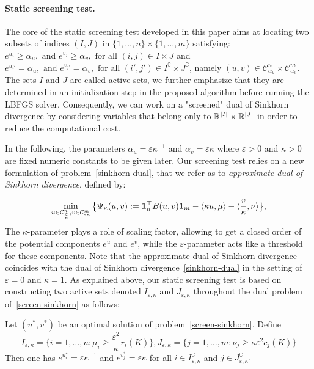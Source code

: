 \paragraph{Static screening test.} The core of the static screening test developed in this paper aims at locating two subsets of indices $(I, J)$ in $\{1, \ldots, n\}\times\{1, \ldots, m\}$ satisfying: $e^{u_i}\geq \alpha_u, \text{ and } e^{v_j}\geq \alpha_v, \text{ for all } (i,j) \in I \times J$ and 
$e^{u_{i'}} = \alpha_u, \text{ and } e^{v_{j'}} = \alpha_v, \text{ for all } (i',j') \in I^\complement \times J^\complement$, namely $(u,v) \in \mathcal{C}^n_{\alpha_u}\times \mathcal{C}^m_{\alpha_v}$.
The sets $I$ and $J$ are called active sets, we further emphasize that they are determined in an initialization step in the proposed algorithm before running the LBFGS solver.
Consequently, we can work on a "screened" dual of Sinkhorn divergence by considering variables that belong only to ${\mathbb{R}}^{|I|} \times {\mathbb{R}}^{|J|}$ in order to reduce the computational cost.

In the following, the parameters $\alpha_u = \varepsilon \kappa^{-1}$ and $\alpha_v = \varepsilon \kappa$ where $\varepsilon > 0$ and $\kappa > 0$ are fixed numeric constants to be given later. 
Our screening test relies on a new formulation of problem~\eqref{sinkhorn-dual}, that we refer as to \emph{approximate dual of Sinkhorn divergence}, defined by:

\begin{equation} 
\label{screen-sinkhorn}
\min_{u \in \mathcal{C}^n_{\frac \varepsilon \kappa}, v\in \mathcal{C}^m_{\varepsilon\kappa}} \big\{\Psi_{\kappa}(u,v):= \mathbf{1}_n^\top B(u,v)\mathbf{1}_m - \langle \kappa u, \mu \rangle - \langle \frac v\kappa, \nu \rangle \big\},
\end{equation}
The $\kappa$-parameter plays a role of scaling factor, allowing to get a closed order of the potential components $e^u$ and $e^v$, while the $\varepsilon$-parameter acts like a threshold for these components.
Note that the approximate dual of Sinkhorn divergence coincides with the dual of Sinkhorn divergence~\eqref{sinkhorn-dual} in the setting of $\varepsilon=0$ and $\kappa=1$.
As explained above, our static screening test is based on constructing two {active sets} denoted $I_{\varepsilon, \kappa}$ and $J_{\varepsilon, \kappa}$ throughout the dual problem of~\eqref{screen-sinkhorn} as follows: 

\begin{lemma}
\label{lemma_actives_sets}
Let $(u^{*}, v^{*})$ be an optimal solution of problem~\eqref{screen-sinkhorn}. 
Define
\begin{equation}
\label{I_epsilon_kappa_J_epsilon_kappa}
I_{\varepsilon,\kappa} = \big\{i=1, \ldots, n: \mu_i \geq \frac {\varepsilon^2} \kappa^{} r_i(K)\big\}, J_{\varepsilon,\kappa} = \big\{j=1, \ldots, m: \nu_j \geq \kappa{\varepsilon^2}{} c_j(K)\big\}
\end{equation}
Then one has $e^{u^{*}_i} = \varepsilon\kappa^{-1}$ and $e^{v^{*}_j} = \varepsilon\kappa$ for all $i \in I^\complement_{\varepsilon,\kappa} $ and $j\in J^\complement_{\varepsilon,\kappa} .$
\end{lemma}

